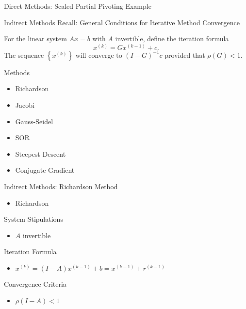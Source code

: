 \documentclass[9pt, serif]{beamer}
\newlength{\wideitemsep}
\let\olditem\item
\renewcommand{\item}{\setlength{\itemsep}{\wideitemsep}\olditem}
\newcommand{\bi}{\begin{itemize}}
\newcommand{\ei}{\end{itemize}}
\newcommand{\abs}[1]{\lvert#1\rvert}
\begin{document}
\begin{frame}{Direct Methods: Scaled Partial Pivoting Example}
    \only<1-3>{$$\max(\abs{1},\abs{2},\abs{1}) = 2$$}
    \only<4-6>{$$\max(\abs{2.5},\abs{2.5}) = 2.5$$}
\end{frame}


\begin{frame}{Indirect Methods}
    \pause
    Recall: General Conditions for Iterative Method Convergence \pause
        \begin{theorem}
        For the linear system $Ax = b$ with $A$ invertible, define the iteration formula $$x^{(k)} = Gx^{(k-1)} + c.$$
        The sequence $\left\{x^{(k)}\right\}$ will converge to $(I - G)^{-1}c$ provided that $\rho(G) < 1$.
    \end{theorem}
    \pause
    Methods
    \bi
        \item Richardson
        \item Jacobi
        \item Gauss-Seidel
        \item SOR
        \item Steepest Descent
        \item Conjugate Gradient
    \ei
\end{frame}


\begin{frame}{Indirect Methods: Richardson}
    Method
    \bi
        \item Richardson
    \ei
    System Stipulations
    \bi
        \item $A$ invertible
    \ei
    Iteration Formula
    \bi
        \item $x^{(k)} = (I-A)x^{(k-1)}+b = x^{(k-1)}+r^{(k-1)}$
    \ei
    Convergence Criteria
    \bi
        \item $\rho(I-A)<1$
    \ei
\end{frame}
\end{document}
